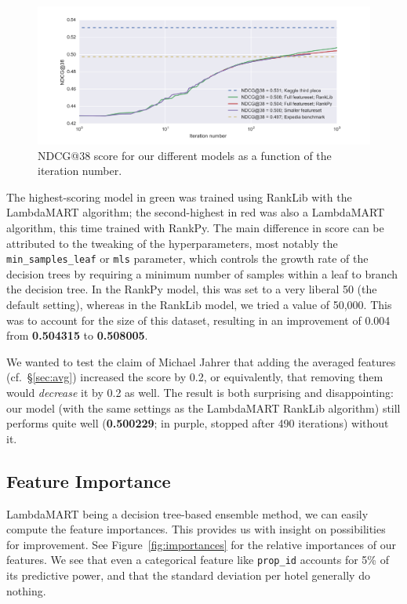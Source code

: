 \documentclass[runningheads,a4paper]{llncs}
\begin{document}
\begin{figure}[h]
	\includegraphics[width=\linewidth]{Pictures/models.png}
    \caption{NDCG@38 score for our different models as a function of the iteration number.}
    \label{fig:valiscore}
\end{figure}

The highest-scoring model in green was trained using RankLib with the LambdaMART algorithm; the second-highest in red was also a LambdaMART algorithm, this time trained with RankPy. The main difference in score can be attributed to the tweaking of the hyperparameters, most notably the \verb|min_samples_leaf| or \verb|mls| parameter, which controls the growth rate of the decision trees by requiring a minimum number of samples within a leaf to branch the decision tree. In the RankPy model, this was set to a very liberal 50 (the default setting), whereas in the RankLib model, we tried a value of 50,000. This was to account for the size of this dataset, resulting in an improvement of 0.004 from \textbf{0.504315} to \textbf{0.508005}.

We wanted to test the claim of Michael Jahrer that adding the averaged features (cf.~\S\ref{sec:avg}) increased the score by 0.2, or equivalently, that removing them would \emph{decrease} it by 0.2 as well. The result is both surprising and disappointing: our model (with the same settings as the LambdaMART RankLib algorithm) still performs quite well (\textbf{0.500229}; in purple, stopped after 490 iterations) without it.

\subsection{Feature Importance}
LambdaMART being a decision tree-based ensemble method, we can easily compute the feature importances. This provides us with insight on possibilities for improvement. See Figure~\ref{fig:importances} for the relative importances of our features. We see that even a categorical feature like \verb|prop_id| accounts for 5\% of its predictive power, and that the standard deviation per hotel generally do nothing. 
\end{document}
